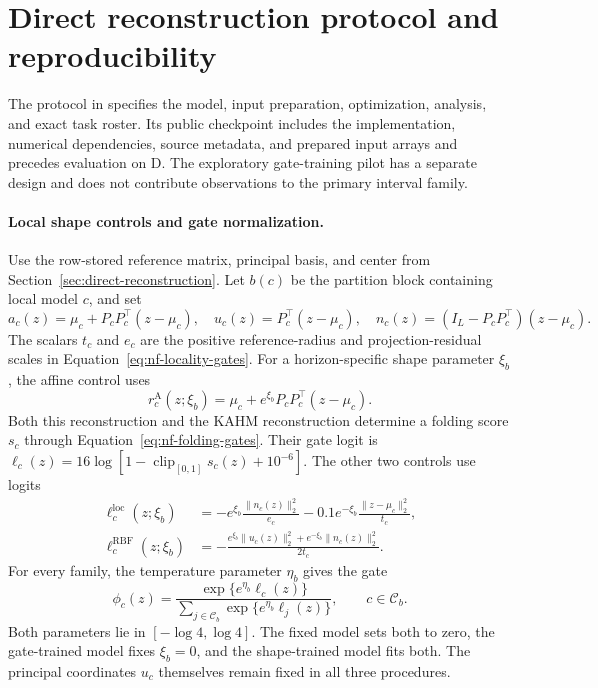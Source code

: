 \section{Direct reconstruction protocol and reproducibility}
\label{app:direct-protocol}

The protocol in 
specifies the model, input preparation, optimization, analysis, and
exact task roster. Its public checkpoint includes the implementation,
numerical dependencies, source metadata, and prepared input arrays and
precedes evaluation on D. The exploratory gate-training pilot has a
separate design and does not contribute observations to the primary
interval family.

\paragraph{Local shape controls and gate normalization.}
Use the row-stored reference matrix, principal basis, and center from
Section~\ref{sec:direct-reconstruction}. Let $b(c)$ be the partition
block containing local model $c$, and set
\[
 a_c(z)=\mu_c+P_cP_c^\top(z-\mu_c),\quad
 u_c(z)=P_c^\top(z-\mu_c),\quad
 n_c(z)=(I_L-P_cP_c^\top)(z-\mu_c).
\]
The scalars $t_c$ and $e_c$ are the positive reference-radius and
projection-residual scales in Equation~\eqref{eq:nf-locality-gates}.
For a horizon-specific shape parameter $\xi_b$, the affine control uses
\[
 r_c^{\mathrm A}(z;\xi_b)=\mu_c+e^{\xi_b}P_cP_c^\top(z-\mu_c).
\]
Both this reconstruction and the KAHM reconstruction determine a folding
score $s_c$ through Equation~\eqref{eq:nf-folding-gates}. Their gate
logit is
$\ell_c(z)=16\log[1-\operatorname{clip}_{[0,1]}s_c(z)+10^{-6}]$.
The other two controls use logits
\begin{align*}
 \ell_c^{\mathrm{loc}}(z;\xi_b)
 &=-e^{\xi_b}\frac{\|n_c(z)\|_2^2}{e_c}
   -0.1e^{-\xi_b}\frac{\|z-\mu_c\|_2^2}{t_c},\\
 \ell_c^{\mathrm{RBF}}(z;\xi_b)
 &=-\frac{e^{\xi_b}\|u_c(z)\|_2^2+
                e^{-\xi_b}\|n_c(z)\|_2^2}{2t_c}.
\end{align*}
For every family, the temperature parameter $\eta_b$ gives the gate
\[
 \phi_c(z)=\frac{\exp\{e^{\eta_b}\ell_c(z)\}}
 {\sum_{j\in\mathcal C_b}\exp\{e^{\eta_b}\ell_j(z)\}},
 \qquad c\in\mathcal C_b.
\]
Both parameters lie in $[-\log4,\log4]$. The fixed model sets both to
zero, the gate-trained model fixes $\xi_b=0$, and the shape-trained
model fits both. The principal coordinates $u_c$ themselves remain
fixed in all three procedures.

